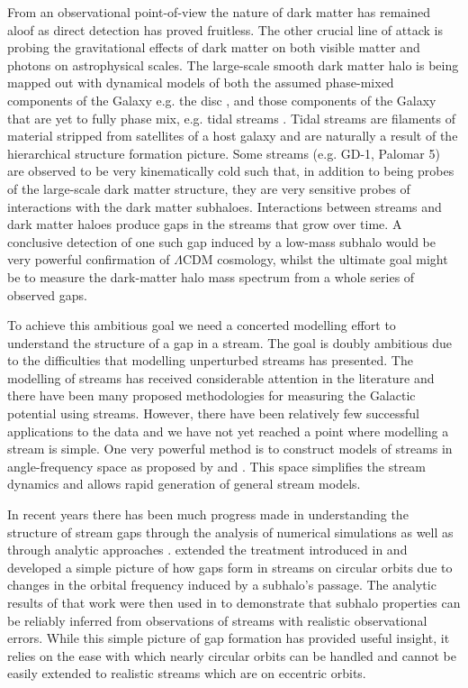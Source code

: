 \documentclass[useAMS,usenatbib,fleqn,a4paper]{mn2e}
\begin{document}
From an observational point-of-view the nature of dark matter has remained aloof as direct detection has proved fruitless. The other crucial line of attack is probing the gravitational effects of dark matter on both visible matter and photons on astrophysical scales. The large-scale smooth dark matter halo is being mapped out with dynamical models of both the assumed phase-mixed components of the Galaxy e.g. the disc \citep[e.g.][]{BovyRix2013, Piffl2014}, and those components of the Galaxy that are yet to fully phase mix, e.g. tidal streams \citep[e.g.][]{Koposov2010,Gibbons2014,Kuepper2015,Bowden2015}. Tidal streams are filaments of material stripped from satellites of a host galaxy and are naturally a result of the hierarchical structure formation picture. Some streams (e.g. GD-1, Palomar 5) are observed to be very kinematically cold such that, in addition to being probes of the large-scale dark matter structure, they are very sensitive probes of interactions with the dark matter subhaloes. Interactions between streams and dark matter haloes produce gaps in the streams that grow over time. A conclusive detection of one such gap induced by a low-mass subhalo would be very powerful confirmation of $\Lambda$CDM cosmology, whilst the ultimate goal might be to measure the dark-matter halo mass spectrum from a whole series of observed gaps.

To achieve this ambitious goal we need a concerted modelling effort to understand the structure of a gap in a stream. The goal is doubly ambitious due to the difficulties that modelling unperturbed streams has presented. The modelling of streams has received considerable attention in the literature and there have been many proposed methodologies for measuring the Galactic potential using streams. However, there have been relatively few successful applications to the data \citep[e.g.][]{Koposov2010,LawMajewski2010,Gibbons2014,Kuepper2015,Bowden2015} and we have not yet reached a point where modelling a stream is simple. One very powerful method is to construct models of streams in angle-frequency space as proposed by \cite{Bovy2014} and \cite{Sanders2014}. This space simplifies the stream dynamics \citep{HelmiWhite1999,Tremaine1999} and allows rapid generation of general stream models.

In recent years there has been much progress made in understanding the structure of stream gaps through the analysis of numerical simulations \citep{SiegalGaskins2008,Carlberg2009,YoonJohnstonHogg,Carlberg2012} as well as through analytic approaches \citep{Carlberg2013,ErkalBelokurov2015,ErkalBelokurov2015b}. \cite{ErkalBelokurov2015} extended the treatment introduced in \cite{Carlberg2013} and developed a simple picture of how gaps form in streams on circular orbits due to changes in the orbital frequency induced by a subhalo's passage. The analytic results of that work were then used in \citet{ErkalBelokurov2015b} to demonstrate that subhalo properties can be reliably inferred from observations of streams with realistic observational errors. While this simple picture of gap formation has provided useful insight, it relies on the ease with which nearly circular orbits can be handled and cannot be easily extended to realistic streams which are on eccentric orbits.
\end{document}
